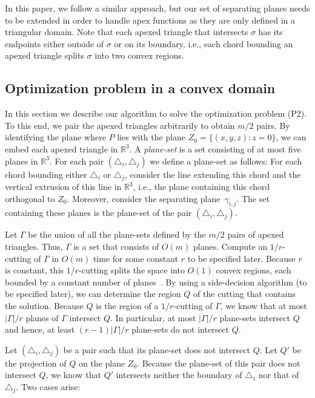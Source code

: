 \documentclass[a4paper,UKenglish]{lipics}
\newcommand{\cell}{\ensuremath{\sigma}}
\begin{document}
In this paper, we follow a similar approach, but our set of separating planes needs to be extended in order to handle apex functions as they are only defined in a triangular domain.
Note that each apexed triangle that intersects $\cell$ has its endpoints either outside of $\cell$ or on its boundary, i.e., each chord bounding an apexed triangle splits $\cell$ into two convex regions.

\subsection{Optimization problem in a convex domain}
In this section we describe our algorithm to solve the optimization problem (P2). 
To this end, we pair the apexed triangles arbitrarily to obtain $m/2$ pairs.
By identifying the plane where $P$ lies with the plane $Z_0 = \{(x,y,z): z = 0\}$, we can embed each apexed triangle in $\mathbb{R}^3$.
A \emph{plane-set} is a set consisting of at most five planes in $\mathbb{R}^3$.
For each pair $(\triangle_i, \triangle_j)$ we define a plane-set as follows: 
For each chord bounding either $\triangle_i$ or $\triangle_j$, consider the line extending this chord and the vertical extrusion of this line in $\mathbb{R}^3$, i.e.,  the plane containing this chord orthogonal to $Z_0$. Moreover, consider the separating plane~$\gamma_{i,j}$. The set containing these planes is the plane-set of the pair $(\triangle_i, \triangle_j)$.

Let $\Gamma$ be the union of all the plane-sets defined by the $m/2$ pairs of apexed triangles. Thus, $\Gamma$ is a set that consists of $O(m)$ planes. Compute an $1/r$-cutting of $\Gamma$ in $O(m)$ time for some constant $r$ to be specified later.
Because $r$ is constant, this $1/r$-cutting splits the space into $O(1)$ convex regions, each bounded by a constant number of planes~\cite{matousekCuttings}. 
By using a side-decision algorithm (to be specified later), we can determine the region $Q$ of the cutting that contains the solution. Because $Q$ is the region of a $1/r$-cutting of $\Gamma$, we know that at most $|\Gamma|/r$ planes of $\Gamma$ intersect $Q$. In particular, at most $|\Gamma|/r$ plane-sets intersect $Q$ and hence, at least $(r-1)|\Gamma|/r$ plane-sets do not intersect $Q$. 

Let $(\triangle_i, \triangle_j)$ be a pair such that its plane-set does not intersect $Q$. 
Let $Q'$ be the projection of $Q$ on the plane $Z_0$. Because the plane-set of this pair does not intersect $Q$, we know that $Q'$ intersects neither the boundary of $\triangle_i$ nor that of $\triangle_j$.
Two cases arise:
\end{document}
